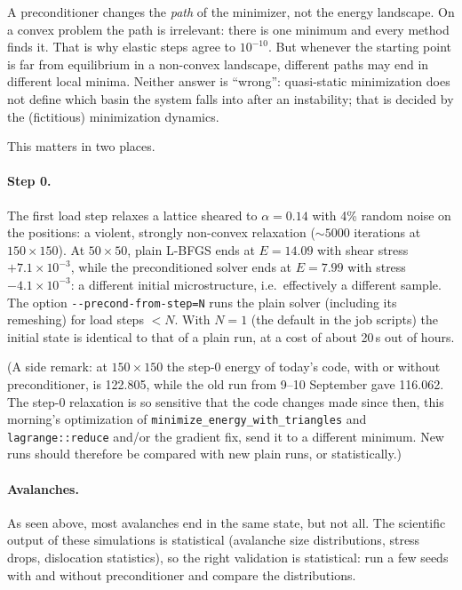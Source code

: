 \documentclass[11pt,a4paper]{article}
\theoremstyle{remark}
\newcommand{\code}[1]{\texttt{#1}}
\begin{document}
A preconditioner changes the \emph{path} of the minimizer, not the energy landscape. On a convex
problem the path is irrelevant: there is one minimum and every method finds it. That is why
elastic steps agree to $10^{-10}$. But whenever the starting point is far from equilibrium in a
non-convex landscape, different paths may end in different local minima. Neither answer is
``wrong'': quasi-static minimization does not define which basin the system falls into after an
instability; that is decided by the (fictitious) minimization dynamics.

This matters in two places.

\paragraph{Step 0.} The first load step relaxes a lattice sheared to $\alpha=0.14$ with 4\%
random noise on the positions: a violent, strongly non-convex relaxation ($\sim5000$ iterations
at $150\times150$). At $50\times50$, plain L-BFGS ends at $E=14.09$ with shear stress
$+7.1\times10^{-3}$, while the preconditioned solver ends at $E=7.99$ with stress
$-4.1\times10^{-3}$: a different initial microstructure, i.e.\ effectively a different sample.
The option \code{-{}-precond-from-step=N} runs the plain solver (including its remeshing) for load
steps $<N$. With $N=1$ (the default in the job scripts) the initial state is identical to that
of a plain run, at a cost of about 20\,s out of hours.

(A side remark: at $150\times150$ the step-0 energy of today's code, with or without
preconditioner, is 122.805, while the old run from 9--10 September gave 116.062. The step-0
relaxation is so sensitive that the code changes made since then, this morning's optimization of
\code{minimize\_\allowbreak{}energy\_\allowbreak{}with\_\allowbreak{}triangles} and \code{lagrange::\allowbreak{}reduce} and/or the gradient fix, send
it to a different minimum. New runs should therefore be compared with new plain runs, or
statistically.)

\paragraph{Avalanches.} As seen above, most avalanches end in the same state, but not all.
The scientific output of these simulations is statistical (avalanche size distributions, stress
drops, dislocation statistics), so the right validation is statistical: run a few seeds with and
without preconditioner and compare the distributions.
\end{document}

